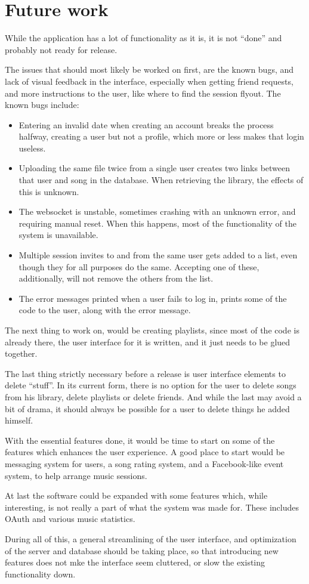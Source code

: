 \section{Future work}
While the application has a lot of functionality as it is, it is not ``done'' and probably not ready
for release.

The issues that should most likely be worked on first, are the known bugs, and lack of visual feedback
in the interface, especially when getting friend requests, and more instructions to the user, like
where to find the session flyout. The known bugs include:
\begin{itemize}
\item{Entering an invalid date when creating an account breaks the process halfway, creating a user 
but not a profile, which more or less makes that login useless.}
\item{Uploading the same file twice from a single user creates two links between that user and song
in the database. When retrieving the library, the effects of this is unknown.}
\item{The websocket is unstable, sometimes crashing with an unknown error, and requiring manual reset.
When this happens, most of the functionality of the system is unavailable.}
\item{Multiple session invites to and from the same user gets added to a list, even though they for all
purposes do the same. Accepting one of these, additionally, will not remove the others from the list.}
\item{The error messages printed when a user fails to log in, prints some of the code to the user,
along with the error message.}
\end{itemize}
The next thing to work on, would be creating playlists, since most of the code is already there, the
user interface for it is written, and it just needs to be glued together.

The last thing strictly necessary before a release is user interface elements to delete ``stuff''.
In its current form, there is no option for the user to delete songs from his library, delete playlists
or delete friends. And while the last may avoid a bit of drama, it should always be possible for
a user to delete things he added himself.

With the essential features done, it would be time to start on some of the features which enhances
the user experience. A good place to start would be messaging system for users, a song rating
system, and a Facebook-like event system, to help arrange music sessions.

At last the software could be expanded with some features which, while interesting, is not really
a part of what the system was made for. These includes OAuth and various music statistics.

During all of this, a general streamlining of the user interface, and optimization of the server and
database should be taking place, so that introducing new features does not mke the interface seem
cluttered, or slow the existing functionality down.
